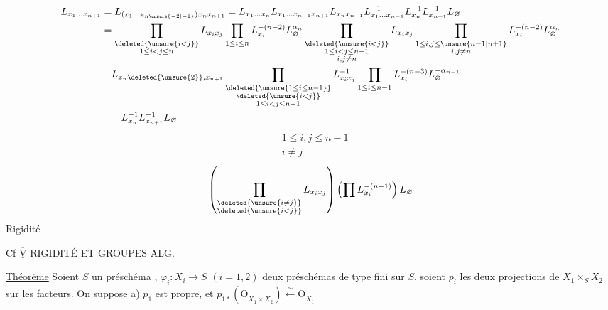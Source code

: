 \[
\begin{aligned}
L_{x_1\ldots x_{n+1}}&=L_{(x_1\ldots x_{n\unsure{-2|-1}})x_n x_{n+1}}=
 L_{x_1\ldots x_n}L_{x_1\ldots x_{n-1}x_{n+1}}L_{x_nx_{n+1}}
 L_{x_1\ldots x_{n-1}}^{-1}L_{x_n}^{-1}L_{x_{n+1}}^{-1}L_{\varnothing}\\
 &=\prod_{\substack{\deleted{\unsure{i<j}}\\1\le i<j\le n}}L_{x_i x_j}
 \prod_{1\le i\le n}L_{x_i}^{-(n-2)}L_{\varnothing}^{\alpha_n}
 \prod_{\substack{\deleted{\unsure{i<j}}\\1\le i<j\le n+1\\i,j\ne n}}L_{x_i x_j}
 \prod_{\substack{1\le i,j\le\unsure{n-1|n+1}\\i,j\ne n}}L_{x_i}^{-(n-2)}L_{\varnothing}^{\alpha_n}\\
 &\quad L_{x_n\deleted{\unsure{2}},x_{n+1}}
 \prod_{\substack{\deleted{\unsure{1\le i\le n-1}}\\\deleted{\unsure{i<j}}\\1\le i<j\le n-1}}L_{x_ix_j}^{-1}
 \prod_{1\le i\le n-1}L_{x_i}^{+(n-3)}L_{\varnothing}^{-\alpha_{n-1}}\\
 &\qquad L_{x_n}^{-1}L_{x_{n+1}}^{-1}L_{\varnothing}
\end{aligned}
\]
\[
\begin{aligned}
&1\le i,j\le n-1\\
&i\ne j
\end{aligned}
\]
\[
\left(\prod_{\substack{\deleted{\unsure{i\ne j}}\\\deleted{\unsure{i<j}}}}L_{x_ix_j}\right)
\left(\prod L_{x_i}^{-(n-1)}\right)L_{\varnothing}
\]
Rigidité

Cf  $\overline{\underline{\mathrm{V}}}$
RIGIDITÉ ET GROUPES ALG. 


\uline{Théorème} Soient $S$ un préschéma , $\varphi_i:X_i\longrightarrow S$ $(i=1,2)$ deux préschémas de type fini sur $S$,   soient $p_i$  les deux projections de $X_1\times_S X_2$ sur les facteurs. On suppose a) $p_1$ est propre, et $p_{1*}(\underline{\mathrm O}_{X_1\times X_2})\xleftarrow{\sim}\underline{\mathrm O}_{X_1}$

